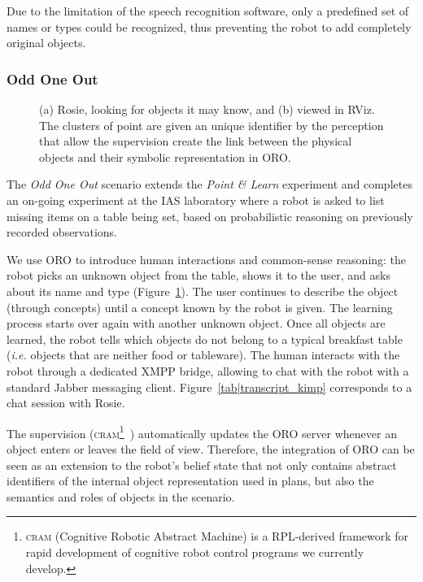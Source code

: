 Due to the limitation of the speech recognition software, only a predefined set of names or types could be recognized, thus preventing the robot to add completely original objects.

\subsubsection{Odd One Out}
\label{expe|odd_one_out}

\begin{figure}
\centering

\caption{(a) Rosie, looking for objects it may know, and (b) viewed in RViz. The clusters of point are given an unique identifier by the perception that allow the supervision create the link between the physical objects and their symbolic representation in ORO.}
\label{fig|kimpwatching}
\end{figure}


The \emph{Odd One Out} scenario extends the \textit{Point \& Learn} experiment and completes an on-going experiment at the IAS laboratory where a robot is asked to list missing items on a table being set, based on probabilistic reasoning on previously recorded observations.

We use ORO to introduce human interactions and common-sense reasoning: the robot picks an unknown object from the table, shows it to the user, and asks about its name and type (Figure~\ref{fig|kimpwatching}). The user continues to describe the object (through concepts) until a concept known by the robot is given. The learning process starts over again with another unknown object. Once all objects are learned, the robot tells which objects do not belong to a typical breakfast table (\textit{i.e.} objects that are neither food or tableware). The human interacts with the robot through a dedicated XMPP bridge, allowing to chat with the robot with a standard Jabber messaging client. Figure~\ref{tab|transcript_kimp} corresponds to a chat session with Rosie.

The supervision (\textsc{cram}\footnote{\textsc{cram} (Cognitive Robotic Abstract Machine) is a RPL-derived framework for rapid development of cognitive robot control programs we currently develop.}~\cite{Beetz2010}) automatically updates the ORO server whenever an object enters or leaves the field of view.
Therefore, the integration of ORO can be seen as an extension to
the robot's belief state that not only contains abstract identifiers
of the internal object representation used in plans, but also the
semantics and roles of objects in the scenario.

